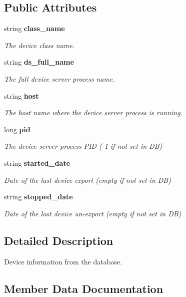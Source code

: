 \subsection*{Public Attributes}
\begin{DoxyCompactItemize}
\item 
string {\bf class\-\_\-name}
\begin{DoxyCompactList}\small\item\em The device class name. \end{DoxyCompactList}\item 
string {\bf ds\-\_\-full\-\_\-name}
\begin{DoxyCompactList}\small\item\em The full device server process name. \end{DoxyCompactList}\item 
string {\bf host}
\begin{DoxyCompactList}\small\item\em The host name where the device server process is running. \end{DoxyCompactList}\item 
long {\bf pid}
\begin{DoxyCompactList}\small\item\em The device server process P\-I\-D (-\/1 if not set in D\-B) \end{DoxyCompactList}\item 
string {\bf started\-\_\-date}
\begin{DoxyCompactList}\small\item\em Date of the last device export (empty if not set in D\-B) \end{DoxyCompactList}\item 
string {\bf stopped\-\_\-date}
\begin{DoxyCompactList}\small\item\em Date of the last device un-\/export (empty if not set in D\-B) \end{DoxyCompactList}\end{DoxyCompactItemize}


\subsection{Detailed Description}
Device information from the database. 

\subsection{Member Data Documentation}
